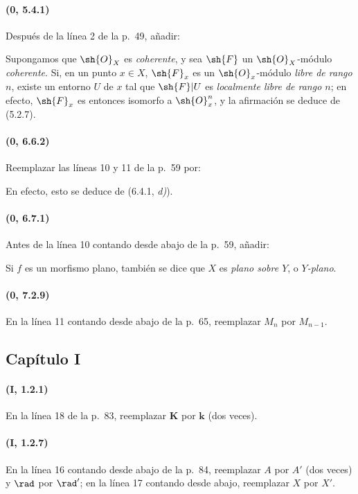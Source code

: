 \documentclass[oneside,10pt]{amsart}
\begin{document}
\paragraph{(0, 5.4.1)}
Después de la línea 2 de la p.~49, añadir:

Supongamos que $\sh{O}_X$ es \emph{coherente}, y sea $\sh{F}$ un
$\sh{O}_X$-módulo \emph{coherente}. Si, en un punto $x\in X$, $\sh{F}_x$ es
un $\sh{O}_x$-módulo \emph{libre de rango $n$}, existe un entorno $U$ de $x$
tal que $\sh{F}|U$ es \emph{localmente libre de rango $n$}; en efecto,
$\sh{F}_x$ es entonces isomorfo a $\sh{O}_x^n$, y la afirmación se
deduce de (5.2.7).

\paragraph{(0, 6.6.2)}
Reemplazar las líneas 10 y 11 de la p.~59 por:

En efecto, esto se deduce de (6.4.1, \emph{d)}).

\paragraph{(0, 6.7.1)}
Antes de la línea 10 contando desde abajo de la p.~59, añadir:

Si $f$ es un morfismo plano, también se dice que $X$ es
\emph{plano sobre $Y$}, o \emph{$Y$-plano}.

\paragraph{(0, 7.2.9)}
En la línea 11 contando desde abajo de la p.~65, reemplazar $M_n$ por
$M_{n-1}$.

\subsection*{Capítulo I}

\paragraph{(I, 1.2.1)}
En la línea 18 de la p.~83, reemplazar $\boldsymbol{K}$ por $\boldsymbol{k}$ (dos veces).

\paragraph{(I, 1.2.7)}
En la línea 16 contando desde abajo de la p.~84, reemplazar $A$ por
$A'$ (dos veces) y $\rad$ por $\rad'$; en la línea 17 contando desde
abajo, reemplazar $X$ por $X'$.
\end{document}
